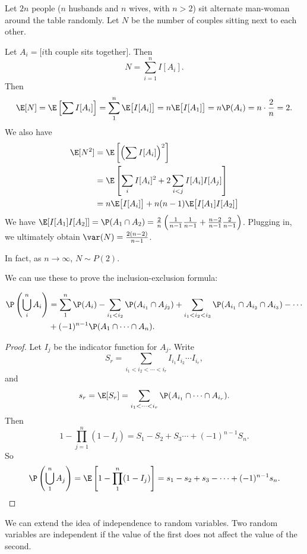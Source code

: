 \documentclass[a4paper]{article}
\begin{document}
\begin{eg}
  Let $2n$ people ($n$ husbands and $n$ wives, with $n > 2$) sit alternate man-woman around the table randomly. Let $N$ be the number of couples sitting next to each other.

  Let $A_i = [i$th couple sits together$]$. Then
  \[
    N = \sum_{i = 1}^n I[A_i].
  \]
  Then
  \[
    \E[N] = \E\left[\sum I[A_i]\right] = \sum_{1}^n \E\big[I[A_i]\big] = n\E\big[I[A_1]\big] = n\P(A_i) = n\cdot \frac{2}{n} = 2.
  \]
  We also have
  \begin{align*}
    \E[N^2] &= \E\left[\left(\sum I[A_i]\right)^2\right]\\
    &= \E\left[\sum_i I[A_i]^2 + 2\sum_{i < j}I[A_i]I[A_j]\right]\\
    &= n\E\big[I[A_i]\big] + n(n - 1)\E\big[I[A_1]I[A_2]\big]
  \end{align*}
  We have $\E[I[A_1]I[A_2]] = \P(A_1\cap A_2) = \frac{2}{n}\left(\frac{1}{n - 1}\frac{1}{n - 1} + \frac{n - 2}{n - 1}\frac{2}{n - 1}\right)$. Plugging in, we ultimately obtain $\var(N) = \frac{2(n- 2)}{n - 1}$.

  In fact, as $n\to \infty$, $N\sim P(2)$.
\end{eg}

We can use these to prove the inclusion-exclusion formula:
\begin{thm}
  \begin{align*}
    \P\left(\bigcup_i^n A_i\right) &= \sum_1^n \P(A_i) - \sum_{i_1 < i_2} \P(A_{i_1}\cap A_{j_2}) + \sum_{i_1 < i_2 < i_3}\P(A_{i_1}\cap A_{i_2} \cap A_{i_3}) - \cdots\\
    &+ (-1)^{n - 1} \P(A_1\cap \cdots \cap A_n).
  \end{align*}
\end{thm}

\begin{proof}
  Let $I_j$ be the indicator function for $A_j$. Write
  \[
    S_r = \sum_{i_1 < i_2 < \cdots < i_r}I_{i_1}I_{i_2}\cdots I_{i_r},
  \]
  and
  \[
    s_r = \E[S_r] = \sum_{i_1 < \cdots < i_r}\P(A_{i_1}\cap \cdots \cap A_{i_r}).
  \]
  Then
  \[
    1 - \prod_{j = 1}^n(1 - I_j) = S_1 - S_2 + S_3 \cdots + (-1)^{n - 1}S_n.
  \]
  So
  \[
    \P\left(\bigcup_1^n A_j\right) = \E\left[1 - \prod_1^n(1 - I_j)\right] = s_1 - s_2 + s_3 - \cdots + (-1)^{n - 1}s_n.\qedhere
  \]
\end{proof}

We can extend the idea of independence to random variables. Two random variables are independent if the value of the first does not affect the value of the second.
\end{document}
